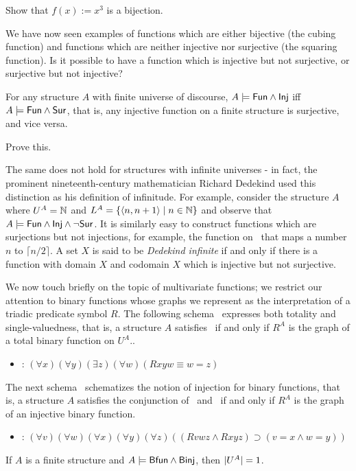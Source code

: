 \begin{aside}
    Show that $f(x) := x^3$ is a bijection. 
\end{aside}

We have now seen examples of functions which are either bijective (the cubing function) and functions which are neither injective nor surjective (the squaring function). Is it possible to have a function which is injective but not surjective, or surjective but not injective?

For any structure $A$ with finite universe of discourse, $A \models \mbox{$\mathsf{Fun}$} \land \mbox{$\mathsf{Inj}$}$ iff $A \models \mbox{$\mathsf{Fun}$} \wedge \mbox{$\mathsf{Sur}$}$, that is, any injective function on a finite structure is surjective, and vice versa. 

\begin{aside}
    Prove this. 
\end{aside}

The same does not hold for structures with infinite universes - in fact, the prominent nineteenth-century mathematician Richard Dedekind used this distinction as his definition of infinitude. For example, consider the structure $A$ where $U^A=\mbox{$\mathbb{N}$}$ and $L^A=\{\mbox{$\langle n,n+1 \rangle$}\mid n\in\mbox{$\mathbb{N}$}\}$ and observe that $A\models\mbox{$\mathsf{Fun}$}\wedge\mbox{$\mathsf{Inj}$}\wedge\neg\mbox{$\mathsf{Sur}$}$. It is similarly easy to construct functions which are surjections but not injections, for example, the function on \N\ that maps a number $n$ to $\lceil n/2\rceil$.  A set $X$ is said to be \emph{Dedekind infinite} if and only if there is a function with domain $X$ and codomain $X$ which is injective but not surjective.


We now touch briefly on the topic of multivariate functions; we restrict our attention to binary functions whose graphs we represent as the interpretation of a triadic predicate symbol $R$. The following schema \bfun\ expresses both totality and single-valuedness, that is, a structure $A$ satisfies \bfun\ if and only if $R^A$ is the graph of a total binary function on $U^A$..
\begin{itemize}
\item
\bfun: $(\forall x)(\forall y)(\exists
z)(\forall 
w)(Rxyw\equiv w = z)$
\end{itemize}
The next schema \binj\ schematizes the notion of injection for binary functions, that is, a structure $A$ satisfies the conjunction of \bfun\ and \binj\ if and only if $R^A$ is the graph of an injective binary function.
\begin{itemize}
\item 
\binj: $(\forall v)(\forall w)(\forall x)(\forall y)(\forall z)((Rvwz \wedge Rxyz)
\supset (v = x \wedge w = y))$
\end{itemize}
If $A$ is a finite structure and $A\models\mbox{$\mathsf{Bfun}$}\wedge\mbox{$\mathsf{Binj}$}$, then $\mbox{$|U^A|$}=1$.


